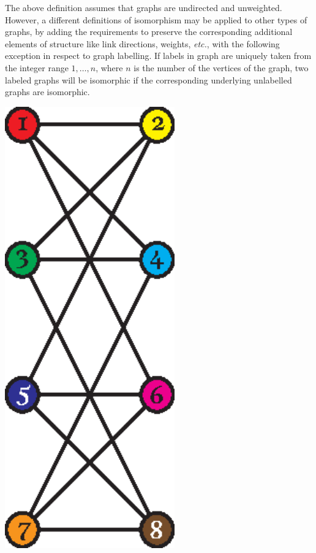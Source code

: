       The above definition assumes that graphs are undirected and unweighted. However, a different definitions of isomorphism may be applied to other types of graphs, by adding the requirements to preserve the corresponding additional elements of structure like link directions, weights, \emph{etc.}, with the following exception in respect to graph labelling. If labels in graph are uniquely taken from the integer range $1,\ldots,n$, where $n$ is the number of the vertices of the graph, two labeled graphs will be isomorphic if the corresponding underlying unlabelled graphs are isomorphic.
      \begin{table}[H]
        \centering
        \begin{minipage}[b]{0.3\textwidth}
          \centering
          \includegraphics[width=0.55\textwidth]{chapters/02_problem_definition/isomorphism_1}

\end{minipage}
\end{table}
